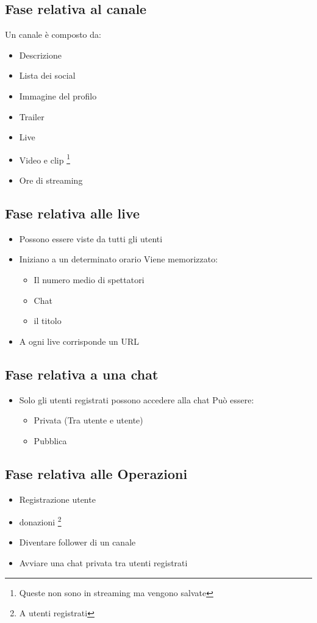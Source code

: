 \subsection{Fase relativa al canale}
Un canale è composto da:
\begin{itemize}
  \item Descrizione
  \item Lista dei social
  \item Immagine del profilo
  \item Trailer 
  \item Live 
  \item Video e clip \footnote{Queste non sono in streaming ma vengono salvate}
  \item Ore di streaming
\end{itemize}

\subsection{Fase relativa alle live}
\begin{itemize}
  \item Possono essere viste da tutti gli utenti
  \item Iniziano a un determinato orario
  Viene memorizzato:
    \begin{itemize}
      \item Il numero medio di spettatori
      \item Chat 
      \item il titolo
    \end{itemize}
    \item A ogni live corrisponde un URL
\end{itemize}

\subsection{Fase relativa a una chat}
\begin{itemize}
  \item Solo gli utenti registrati possono accedere alla chat
  Può essere:
  \begin{itemize}
    \item Privata (Tra utente e utente)
    \item Pubblica 
  \end{itemize}
\end{itemize}

\subsection{Fase relativa alle Operazioni}
\begin{itemize}
  \item Registrazione utente
  \item donazioni \footnote{A utenti registrati}
  \item Diventare follower di un canale
  \item Avviare una chat privata tra utenti registrati
\end{itemize}